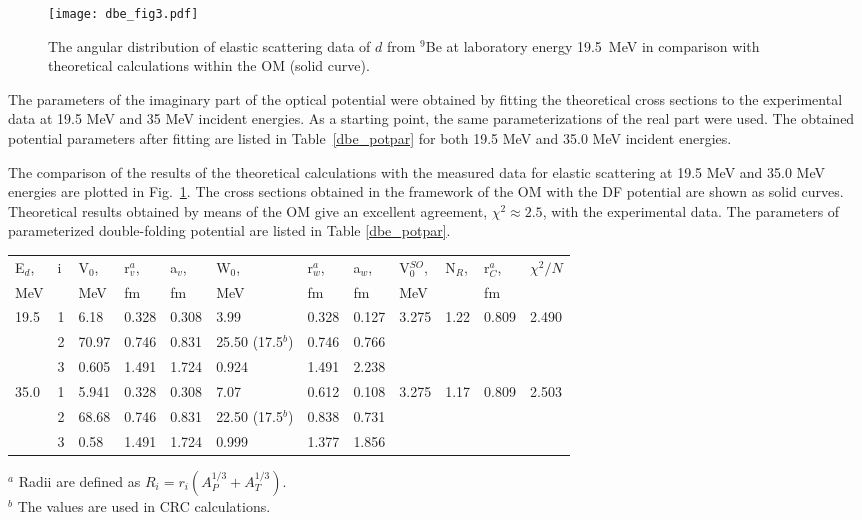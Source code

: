 \documentclass[
12pt, %
oneside, %
english, %
onehalfspacing, %
onehalfspacing, %
headsepline, %
]{MastersDoctoralThesis} %
\begin{document}
\begin{figure}[bp!]
\centering
\texttt{[image: dbe\_fig3.pdf]}
\decoRule
\caption{ \label{dbe_fig3} \footnotesize The angular distribution of elastic scattering data of $d$ from ${}^9$Be at laboratory energy 19.5~MeV in comparison with theoretical calculations within the OM (solid curve). }
\end{figure}

The parameters of the imaginary part of the optical potential were obtained by fitting the theoretical cross sections to the experimental data at 19.5 MeV and 35 MeV incident energies. As a starting point, the same parameterizations of the real part were used. The obtained potential parameters after fitting are listed in Table~\ref{dbe_potpar} for both 19.5 MeV and 35.0 MeV incident energies.

The comparison of the results of the theoretical calculations with  the measured data for elastic scattering at 19.5 MeV and 35.0 MeV energies are plotted in Fig.~\ref{dbe_fig3}. 
The cross sections obtained in the framework of the OM with the DF potential are shown as solid curves. 
Theoretical results obtained by means of the OM give an excellent agreement, $\chi^2\approx2.5$, with the experimental data. The  parameters of  parameterized double-folding potential are listed in Table \ref{dbe_potpar}. 

\begin{table*}[bp]
\footnotesize
\caption{\label{dbe_potpar} \footnotesize Parameterized double-folding potentials of the $d$+$^9$Be system used in the OM, CC and DWBA calculations.}
\begin{tabular*}{\textwidth}{ll@{\extracolsep{\fill}}llllllllll}
\toprule
E$_d$, & i & V$_0$, & r$_v^{a}$, & a$_v$, & W$_0$, & r$_w^{a}$, & a$_w$, & V$_0^{SO}$, & N$_R$, & r$_C^{a}$, & $\chi^2/N$ \\
MeV   &   & MeV   & fm    & fm    & MeV   & fm    & fm    & MeV        &       & fm   						& \\ \midrule
19.5  & 1 & 6.18  & 0.328 & 0.308 & 3.99  & 0.328 & 0.127 & 3.275      & 1.22  & 0.809 			& 	2.490	\\
      & 2 & 70.97 & 0.746 & 0.831 & 25.50 (17.5$^{b}$) & 0.746 & 0.766 &            &       &    						&   \\
      & 3 & 0.605 & 1.491 & 1.724 & 0.924 & 1.491 & 2.238 &            &       &   							&    \\ \midrule
35.0  & 1 & 5.941 & 0.328 & 0.308 & 7.07  & 0.612 & 0.108 & 3.275      & 1.17  & 0.809 			&	2.503\\
      & 2 & 68.68 & 0.746 & 0.831 & 22.50 (17.5$^{b}$)& 0.838 & 0.731 &            &       &       						&\\
      & 3 & 0.58  & 1.491 & 1.724 & 0.999 & 1.377 & 1.856 &            &       &      							& \\ \bottomrule
\end{tabular*}
\scriptsize
$^{a}$ Radii are defined as $R_i = r_i \left( A^{1/3}_P+A^{1/3}_T \right)$.  \\
$^{b}$ The values are used in CRC calculations. \\
\end{table*}
\end{document}
